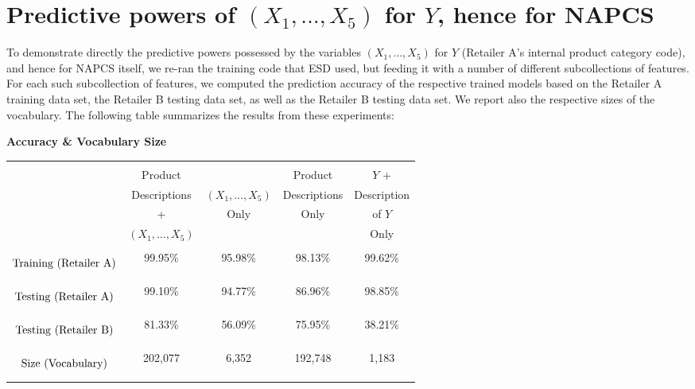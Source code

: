 
\section{Predictive powers of $(X_{1}, \ldots ,X_{5})$ for $Y$, hence for NAPCS}
\setcounter{theorem}{0}
\setcounter{equation}{0}



To demonstrate directly the predictive powers possessed by the variables
$(X_{1}, \ldots ,X_{5})$ for $Y$ (Retailer A's internal product category code),
and hence for NAPCS itself, we re-ran the training code that ESD used, but
feeding it with a number of different subcollections of features.
For each such subcollection of features, we computed the prediction accuracy of
the respective trained models based on the Retailer A training data set,
the Retailer B testing data set, as well as the Retailer B testing data set.
We report also the respective sizes of the vocabulary.
The following table summarizes the results from these experiments:

\vskip 0.5cm
\begin{center}
\textbf{Accuracy \& Vocabulary Size}
\vskip 0.1cm
\begin{tabular}{|c|c|c|c|c|}
\hline
&&&&\\
& Product & & Product & $Y$ + \\
& Descriptions & $(X_{1}, \ldots ,X_{5})$ & Descriptions & Description \\
& + & Only & Only & of $Y$ \\
& $(X_{1}, \ldots ,X_{5})$ & & & Only \\
&&&&\\
\hline\hline
$\overset{{\color{white}-}}{\underset{{\color{white}-}}{\textnormal{Training (Retailer A)}}}$ &
	99.95\% & 95.98\% & 98.13\% & 99.62\% \\
\hline
$\overset{{\color{white}-}}{\underset{{\color{white}-}}{\textnormal{Testing (Retailer A)}}}$ &
	99.10\% & 94.77\% & 86.96\% & 98.85\% \\
\hline
$\overset{{\color{white}-}}{\underset{{\color{white}-}}{\textnormal{Testing (Retailer B)}}}$ &
	81.33\% & 56.09\% & 75.95\% & 38.21\% \\
\hline
$\overset{{\color{white}-}}{\underset{{\color{white}-}}{\textnormal{Size (Vocabulary)}}}$ &
  202,077 & 6,352 & 192,748 & 1,183 \\
\hline
\end{tabular}
\end{center}

